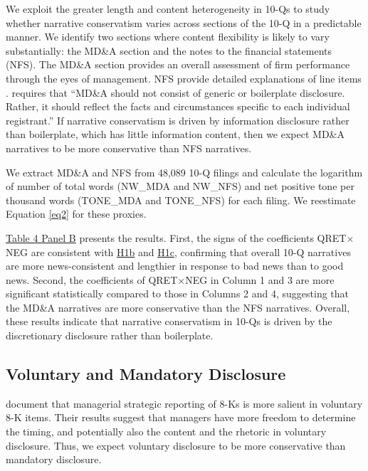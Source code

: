 \documentclass[letterpaper,12pt]{article}
\begin{document}
\begin{spacing}{1.5}
We exploit the greater length and content heterogeneity in 10-Qs to study whether narrative conservatism varies across sections of the 10-Q in a predictable manner. We identify two sections where content flexibility is likely to vary substantially: the MD\&A section and the notes to the financial statements (NFS). The MD\&A section provides an overall assessment of firm performance through the eyes of management. NFS provide detailed explanations of line items \cite{fasbConceptualFrameworkFinancial2018a, secFinancialReportingManual2019}.  requires that ``MD\&A should not consist of generic or boilerplate disclosure. Rather, it should reflect the facts and circumstances specific to each individual registrant.'' If narrative conservatism is driven by information disclosure rather than boilerplate, which has little information content, then we expect MD\&A narratives to be more conservative than NFS narratives.

We extract MD\&A and NFS from 48,089 10-Q filings and calculate the logarithm of number of total words (NW\_MDA and NW\_NFS) and net positive tone per thousand words (TONE\_MDA and TONE\_NFS) for each filing. We reestimate Equation \eqref{eq2} for these proxies.

\hyperref[T4PB]{Table 4 Panel B} presents the results. First, the signs of the coefficients QRET$\times$NEG are consistent with \hyperref[hyp:h1b]{H1b} and \hyperref[hyp:h1c]{H1c}, confirming that overall 10-Q narratives are more news-consistent and lengthier in response to bad news than to good news. Second, the coefficients of QRET$\times$NEG in Column 1 and 3 are more significant statistically compared to those in Columns 2 and 4, suggesting that the MD\&A narratives are more conservative than the NFS narratives. Overall, these results indicate that narrative conservatism in 10-Qs is driven by the discretionary disclosure rather than boilerplate.

\subsection{Voluntary and Mandatory Disclosure}
\noindent {} document that managerial strategic reporting of 8-Ks is more salient in voluntary 8-K items. Their results suggest that managers have more freedom to determine the timing, and potentially also the content and the rhetoric in voluntary disclosure. Thus, we expect voluntary disclosure to be more conservative than mandatory disclosure.


\end{spacing}
\end{document}
